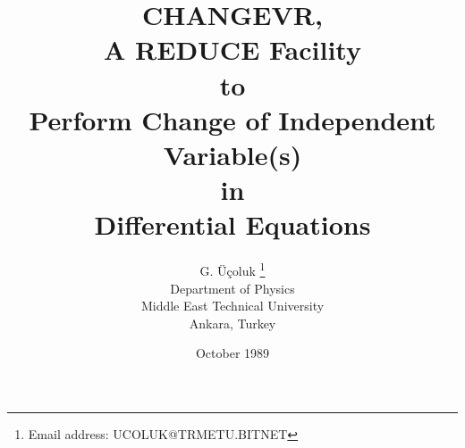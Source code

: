 \newcommand{\definedas}{\stackrel{\triangle}{=}}
\newcommand{\spc}{\;\;\;\;\;}
\newcommand{\mspc}{\;\;\;\;\;\;\;\;\;\;}
\newcommand{\lspc}{\;\;\;\;\;\;\;\;\;\;\;\;\;\;\;}


\renewcommand{\baselinestretch}{1.1}
\newcommand{\eg}[1]{\begin{quote}{\tt #1} \end{quote}}
\setlength{\textwidth}{15cm}
\addtolength{\oddsidemargin}{-1cm}

\title{                    CHANGEVR,  \\
                         A REDUCE Facility   \\
                              to   \\
                    Perform Change of Independent Variable(s)\\
                               in \\
                    Differential Equations\\[2cm]
        }
\author{
          G. \"{U}\c{c}oluk
	     \thanks{Email address: UCOLUK@TRMETU.BITNET}
                     \\
                               Department of Physics \\
                               Middle East Technical University \\
                               Ankara, Turkey
       }
\date{October 1989}


\maketitle
\newpage

